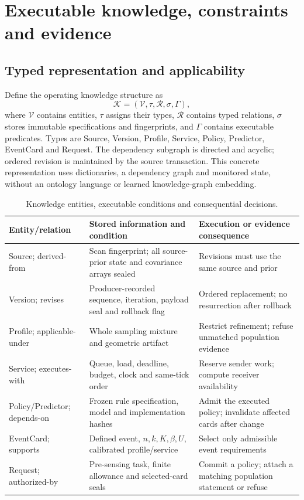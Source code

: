 \section{Executable knowledge, constraints and evidence}\label{sec:knowledge}
\subsection{Typed representation and applicability}
Define the operating knowledge structure as
\begin{equation}
\mathcal K=(\mathcal V,\tau,\mathcal R,\sigma,\Gamma),\label{eq:knowledge-record}
\end{equation}
where $\mathcal V$ contains entities, $\tau$ assigns their types, $\mathcal R$ contains typed relations, $\sigma$ stores immutable specifications and fingerprints, and $\Gamma$ contains executable predicates. Types are Source, Version, Profile, Service, Policy, Predictor, EventCard and Request. The dependency subgraph is directed and acyclic; ordered revision is maintained by the source transaction. This concrete representation uses dictionaries, a dependency graph and monitored state, without an ontology language or learned knowledge-graph embedding.

\begin{table}[t]\centering\small
\caption{Knowledge entities, executable conditions and consequential decisions.}\label{tab:knowledge}
\begin{tabularx}{\linewidth}{@{}lXX@{}}\toprule
Entity/relation & Stored information and condition & Execution or evidence consequence\\\midrule
Source; derived-from & Scan fingerprint; all source-prior state and covariance arrays sealed & Revisions must use the same source and prior\\
Version; revises & Producer-recorded sequence, iteration, payload seal and rollback flag & Ordered replacement; no resurrection after rollback\\
Profile; applicable-under & Whole sampling mixture and geometric artifact & Restrict refinement; refuse unmatched population evidence\\
Service; executes-with & Queue, load, deadline, budget, clock and same-tick order & Reserve sender work; compute receiver availability\\
Policy/Predictor; depends-on & Frozen rule specification, model and implementation hashes & Admit the executed policy; invalidate affected cards after change\\
EventCard; supports & Defined event, $n,k,K,\beta,U$, calibrated profile/service & Select only admissible event requirements\\
Request; authorized-by & Pre-sensing task, finite allowance and selected-card seals & Commit a policy; attach a matching population statement or refuse\\\bottomrule
\end{tabularx}
\end{table}

